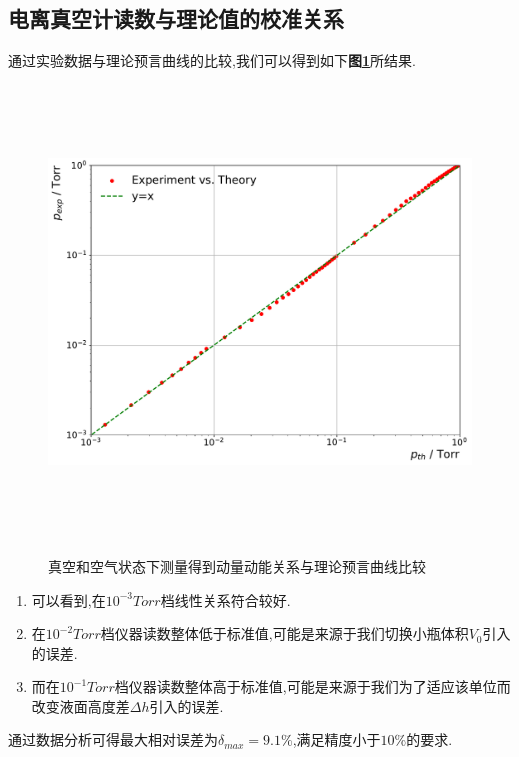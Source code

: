 \documentclass[a4paper]{article}
\begin{document}
\subsection{电离真空计读数与理论值的校准关系}\label{sub:4}

通过实验数据与理论预言曲线的比较,我们可以得到如下\textbf{图\ref{fig:fig5}}所结果. 
\begin{figure}[H]
 \centering
 \caption{真空和空气状态下测量得到动量动能关系与理论预言曲线比较}
 \includegraphics[height=12cm, width=16cm]{images/phyex1_fig3.pdf}
 \label{fig:fig5}
\end{figure}
\begin{enumerate}[1)]
    \item 可以看到,在$10^{-3}\si{Torr}$档线性关系符合较好.
    \item 在$10^{-2}\si{Torr}$档仪器读数整体低于标准值,可能是来源于我们切换小瓶体积$V_0$引入的误差.
    \item 而在$10^{-1}\si{Torr}$档仪器读数整体高于标准值,可能是来源于我们为了适应该单位而改变液面高度差$\Delta h$引入的误差.
\end{enumerate}






通过数据分析可得最大相对误差为$\delta_{max}=9.1\%$,满足精度小于$10\%$的要求.

\newpage
\end{document}

